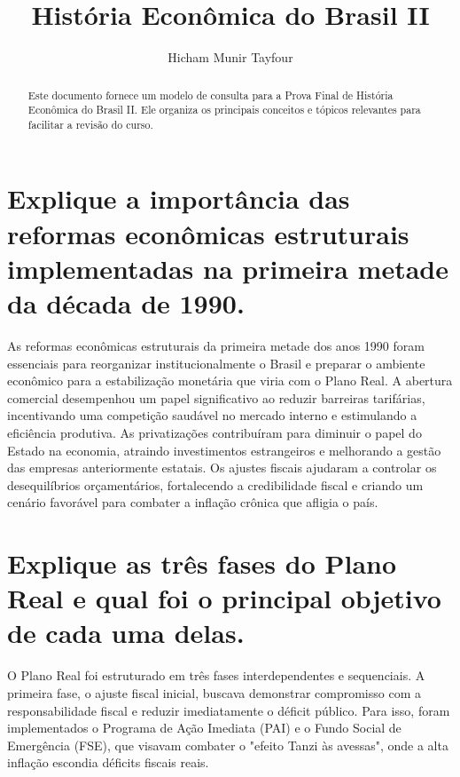 \documentclass{sciposter}
\title{História Econômica do Brasil II}
\author{Hicham Munir Tayfour}
\institute 
{Bacharelado em Economia\\
Insper - Instituto de Ensino e Pesquisa\\
São Paulo, Brasil}
\begin{document}

\maketitle

\begin{multicols}{3}
\fontsize{17pt}{7pt}\selectfont

\begin{abstract}
Este documento fornece um modelo de consulta para a Prova Final de História Econômica do Brasil II. Ele organiza os principais conceitos e tópicos relevantes para facilitar a revisão do curso.
\end{abstract}

\section{\textbf{Explique a importância das reformas econômicas estruturais implementadas na primeira metade da década de 1990.}}

As reformas econômicas estruturais da primeira metade dos anos 1990 foram essenciais para reorganizar institucionalmente o Brasil e preparar o ambiente econômico para a estabilização monetária que viria com o Plano Real. A abertura comercial desempenhou um papel significativo ao reduzir barreiras tarifárias, incentivando uma competição saudável no mercado interno e estimulando a eficiência produtiva. As privatizações contribuíram para diminuir o papel do Estado na economia, atraindo investimentos estrangeiros e melhorando a gestão das empresas anteriormente estatais. Os ajustes fiscais ajudaram a controlar os desequilíbrios orçamentários, fortalecendo a credibilidade fiscal e criando um cenário favorável para combater a inflação crônica que afligia o país.

\section{\textbf{Explique as três fases do Plano Real e qual foi o principal objetivo de cada uma delas.}}

O Plano Real foi estruturado em três fases interdependentes e sequenciais. A primeira fase, o ajuste fiscal inicial, buscava demonstrar compromisso com a responsabilidade fiscal e reduzir imediatamente o déficit público. Para isso, foram implementados o Programa de Ação Imediata (PAI) e o Fundo Social de Emergência (FSE), que visavam combater o "efeito Tanzi às avessas", onde a alta inflação escondia déficits fiscais reais.


\end{multicols}
\end{document}
